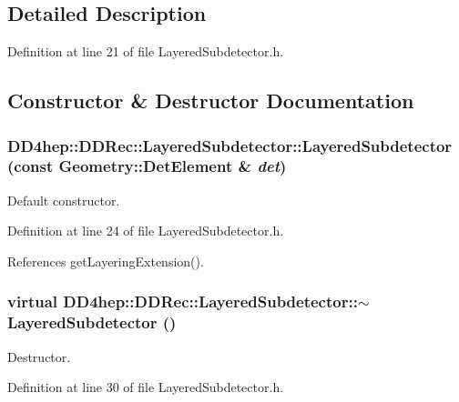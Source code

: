 \subsection{Detailed Description}


Definition at line 21 of file LayeredSubdetector.h.

\subsection{Constructor \& Destructor Documentation}
\hypertarget{class_d_d4hep_1_1_d_d_rec_1_1_layered_subdetector_a0897f69fe293527bc70f91840db345ea}{
\subsubsection[{LayeredSubdetector}]{\setlength{\rightskip}{0pt plus 5cm}DD4hep::DDRec::LayeredSubdetector::LayeredSubdetector (const {\bf Geometry::DetElement} \& {\em det})}}
\label{class_d_d4hep_1_1_d_d_rec_1_1_layered_subdetector_a0897f69fe293527bc70f91840db345ea}


Default constructor. 

Definition at line 24 of file LayeredSubdetector.h.

References getLayeringExtension().\hypertarget{class_d_d4hep_1_1_d_d_rec_1_1_layered_subdetector_a8fd9a44526c4856456d59fbb36efd6af}{
\subsubsection[{$\sim$LayeredSubdetector}]{\setlength{\rightskip}{0pt plus 5cm}virtual DD4hep::DDRec::LayeredSubdetector::$\sim$LayeredSubdetector ()}}
\label{class_d_d4hep_1_1_d_d_rec_1_1_layered_subdetector_a8fd9a44526c4856456d59fbb36efd6af}


Destructor. 

Definition at line 30 of file LayeredSubdetector.h.

